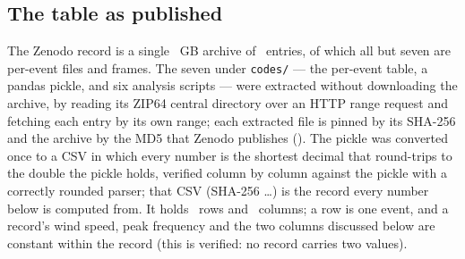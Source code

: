 \documentclass[preprint,11pt,authoryear]{elsarticle}
\begin{document}
\subsection{The table as published}\label{sec:table}
The Zenodo record \citep{zenodo2026} is a single \ArchiveGB\ GB archive of \ArchiveEntries\ entries, of which all but seven are per-event files and frames. The seven under \texttt{codes/} --- the per-event table, a pandas pickle, and six analysis scripts --- were extracted without downloading the archive, by reading its ZIP64 central directory over an HTTP range request and fetching each entry by its own range; each extracted file is pinned by its SHA-256 and the archive by the MD5 that Zenodo publishes (\ArchiveMd). The pickle was converted once to a CSV in which every number is the shortest decimal that round-trips to the double the pickle holds, verified column by column against the pickle with a correctly rounded parser; that CSV (SHA-256 \CsvSha\ldots) is the record every number below is computed from. It holds \NEvents\ rows and \NColumns\ columns; a row is one event, and a record's wind speed, peak frequency and the two columns discussed below are constant within the record (this is verified: no record carries two values).
\end{document}
